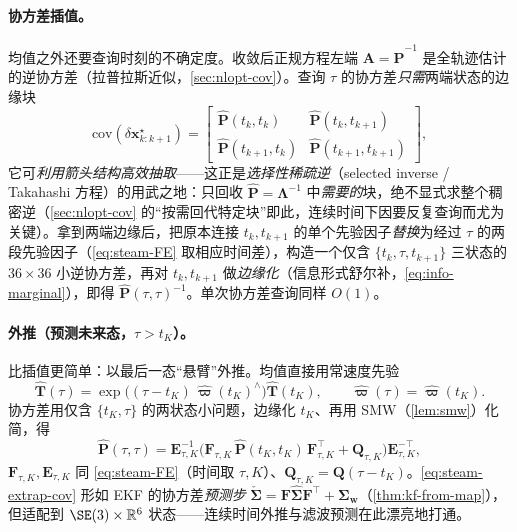 \paragraph{协方差插值。}
均值之外还要查询时刻的不确定度。收敛后正规方程左端 $\mathbf{A}=\hat{\mathbf{P}}^{-1}$ 是全轨迹估计的逆协方差（拉普拉斯近似，\cref{sec:nlopt-cov}）。查询 $\tau$ 的协方差\emph{只需}两端状态的边缘块
\begin{equation}
  \mathrm{cov}(\delta\mathbf{x}_{k:k+1}^\star)=\begin{bmatrix}\hat{\mathbf{P}}(t_k,t_k)&\hat{\mathbf{P}}(t_k,t_{k+1})\\\hat{\mathbf{P}}(t_{k+1},t_k)&\hat{\mathbf{P}}(t_{k+1},t_{k+1})\end{bmatrix},
  \label{eq:steam-cov-bracket}
\end{equation}
它可\emph{利用箭头结构高效抽取}——这正是\emph{选择性稀疏逆}（selected inverse / Takahashi 方程）的用武之地：只回收 $\hat{\mathbf{P}}=\boldsymbol{\Lambda}^{-1}$ 中\emph{需要的}块，绝不显式求整个稠密逆（\cref{sec:nlopt-cov} 的“按需回代特定块”即此，连续时间下因要反复查询而尤为关键）。拿到两端边缘后，把原本连接 $t_k,t_{k+1}$ 的单个先验因子\emph{替换}为经过 $\tau$ 的两段先验因子（\cref{eq:steam-FE} 取相应时间差），构造一个仅含 $\{t_k,\tau,t_{k+1}\}$ 三状态的 $36\times36$ 小逆协方差，再对 $t_k,t_{k+1}$ 做\emph{边缘化}（信息形式舒尔补，\cref{eq:info-marginal}），即得 $\hat{\mathbf{P}}(\tau,\tau)^{-1}$。单次协方差查询同样 $O(1)$。

\paragraph{外推（预测未来态，$\tau>t_K$）。}
比插值更简单：以最后一态“悬臂”外推。均值直接用常速度先验
\begin{equation}
  \hat{\mathbf{T}}(\tau)=\exp\!\big((\tau-t_K)\,\hat{\boldsymbol{\varpi}}(t_K)^\wedge\big)\hat{\mathbf{T}}(t_K),\qquad
  \hat{\boldsymbol{\varpi}}(\tau)=\hat{\boldsymbol{\varpi}}(t_K).
  \label{eq:steam-extrap}
\end{equation}
协方差用仅含 $\{t_K,\tau\}$ 的两状态小问题，边缘化 $t_K$、再用 SMW（\cref{lem:smw}）化简，得
\begin{equation}
  \hat{\mathbf{P}}(\tau,\tau)=\mathbf{E}_{\tau,K}^{-1}\big(\mathbf{F}_{\tau,K}\,\hat{\mathbf{P}}(t_K,t_K)\,\mathbf{F}_{\tau,K}^\top+\mathbf{Q}_{\tau,K}\big)\mathbf{E}_{\tau,K}^{-\top},
  \label{eq:steam-extrap-cov}
\end{equation}
$\mathbf{F}_{\tau,K},\mathbf{E}_{\tau,K}$ 同 \cref{eq:steam-FE}（时间取 $\tau,K$）、$\mathbf{Q}_{\tau,K}=\mathbf{Q}(\tau-t_K)$。\cref{eq:steam-extrap-cov} 形如 EKF 的协方差\emph{预测步} $\check{\boldsymbol{\Sigma}}=\mathbf{F}\hat{\boldsymbol{\Sigma}}\mathbf{F}^\top+\boldsymbol{\Sigma}_{\mathbf{w}}$（\cref{thm:kf-from-map}），但适配到 $\SE(3)\times\mathbb{R}^6$ 状态——连续时间外推与滤波预测在此漂亮地打通。

